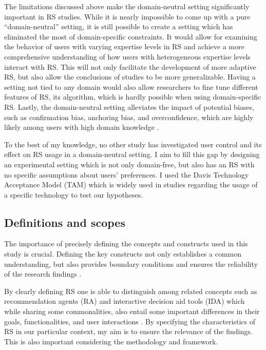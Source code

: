 \documentclass[a4paper,12pt]{article}
\begin{document}
The limitations discussed above make the domain-neutral setting significantly important in RS studies. While it is nearly impossible to come up with a pure ``domain-neutral'' setting, it is still possible to create a setting which has eliminated the most of domain-specific constraints. It would allow for examining the behavior of users with varying expertise levels in RS and achieve a more comprehensive understanding of how users with heterogeneous expertise levels interact with RS. This will not only facilitate the development of more adaptive RS, but also allow the conclusions of studies to be more generalizable. Having a setting not tied to any domain would also allow researchers to fine tune different features of RS, its algorithm, which is hardly possible when using domain-specific RS. Lastly, the domain-neutral setting alleviates the impact of potential biases, such as confirmation bias, anchoring bias, and overconfidence, which are highly likely among users with high domain knowledge \citep{hijikata2012relation}.

To the best of my knowledge, no other study has investigated user control and its effect on RS usage in a domain-neutral setting. I aim to fill this gap by designing an experimental setting which is not only domain-free, but also has an RS with no specific assumptions about users' preferences. I used the Davis Technology Acceptance Model (TAM) which is widely used in studies regarding the usage of a specific technology \citep{davis1985technology} to test our hypotheses.

\subsection{Definitions and scopes}

The importance of precisely defining the concepts and constructs used in this study is crucial. Defining the key constructs not only establishes a common understanding, but also provides boundary conditions and ensures the reliability of the research findings \citep{creswell2013research}.

By clearly defining RS one is able to distinguish among related concepts such as recommendation agents (RA) and interactive decision aid tools (IDA) which while sharing some commonalities, also entail some important differences in their goals, functionalities, and user interactions \citep{xiao2007commerce}. By specifying the characteristics of RS in our particular context, my aim is to ensure the relevance of the findings. This is also important considering the methodology and framework.
\end{document}
